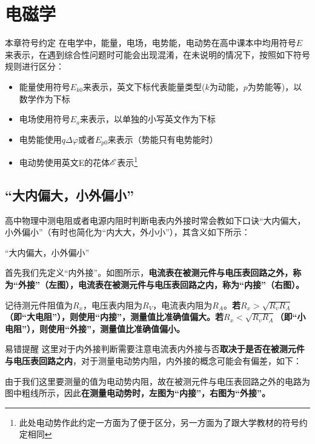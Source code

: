 
\chapter{电磁学}

\begin{mk}{本章符号约定}{}
在电学中，能量，电场，电势能，电动势在高中课本中均用符号$E$来表示，在遇到综合性问题时可能会出现混淆，在未说明的情况下，按照如下符号规则进行区分：

\begin{itemize}
\item 能量使用符号$E_{k0}$来表示，英文下标代表能量类型($k$为动能，$p$为势能等)，以数学作为下标
\item 电场使用符号$E_a$来表示，以单独的小写英文作为下标
\item 电势能使用$q \Delta \varphi$或者$E_{p0}$来表示（势能只有电势能时）
\item 电动势使用英文E的花体$\mathscr{E}$表示\footnote{此处电动势作此约定一方面为了便于区分，另一方面为了跟大学教材的符号约定相同}
\end{itemize}
\end{mk}

\section{“大内偏大，小外偏小”}

高中物理中测电阻或者电源内阻时判断电表内外接时常会教如下口诀“大内偏大，小外偏小”（有时也简化为“内大大，外小小”），其含义如下所示：

\begin{theo}{“大内偏大，小外偏小”}{}



首先我们先定义“内外接”。如图所示，\textbf{电流表在被测元件与电压表回路之外，称为“外接”（左图），电流表在被测元件与电压表回路之内，称为“内接”（右图）。}

记待测元件阻值为$R_x$，电压表内阻为$R_V$，电流表内阻为$R_A$。\textbf{若$R_x > \sqrt{R_v R_A}$（即“大电阻”），则使用“内接”，测量值比准确值偏大。若$R_x < \sqrt{R_v R_A}$（即“小电阻”），则使用“外接”，测量值比准确值偏小。}

\end{theo}

\begin{mk}{易错提醒}{}
这里对于内外接判断需要注意电流表内外接与否\textbf{取决于是否在被测元件与电压表回路之内}，对于测量电动势内阻，内外接的概念可能会有偏差，如下：



由于我们这里要测量的值为电动势内阻，故在被测元件与电压表回路之外的电路为图中粗线所示，因此\textbf{在测量电动势时，左图为“内接”，右图为“外接”。}
\end{mk}


